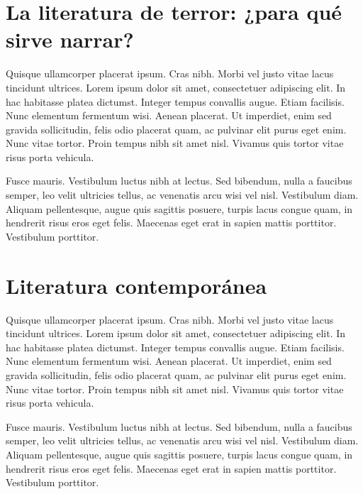 \section{La literatura de terror: ¿para qué sirve narrar?}

Quisque ullamcorper placerat ipsum. Cras nibh. Morbi vel justo vitae lacus tincidunt ultrices. Lorem ipsum dolor sit amet, consectetuer adipiscing elit. In hac habitasse platea dictumst. Integer tempus convallis augue. Etiam facilisis. Nunc elementum fermentum wisi. Aenean placerat. Ut imperdiet, enim sed gravida sollicitudin, felis odio placerat quam, ac pulvinar elit purus eget enim. Nunc vitae tortor. Proin tempus nibh sit amet nisl. Vivamus quis tortor vitae risus porta vehicula.

Fusce mauris. Vestibulum luctus nibh at lectus. Sed bibendum, nulla a faucibus semper, leo velit ultricies tellus, ac venenatis arcu wisi vel nisl. Vestibulum diam. Aliquam pellentesque, augue quis sagittis posuere, turpis lacus congue quam, in hendrerit risus eros eget felis. Maecenas eget erat in sapien mattis porttitor. Vestibulum porttitor.

\section{Literatura contemporánea}

Quisque ullamcorper placerat ipsum. Cras nibh. Morbi vel justo vitae lacus tincidunt ultrices. Lorem ipsum dolor sit amet, consectetuer adipiscing elit. In hac habitasse platea dictumst. Integer tempus convallis augue. Etiam facilisis. Nunc elementum fermentum wisi. Aenean placerat. Ut imperdiet, enim sed gravida sollicitudin, felis odio placerat quam, ac pulvinar elit purus eget enim. Nunc vitae tortor. Proin tempus nibh sit amet nisl. Vivamus quis tortor vitae risus porta vehicula.

Fusce mauris. Vestibulum luctus nibh at lectus. Sed bibendum, nulla a faucibus semper, leo velit ultricies tellus, ac venenatis arcu wisi vel nisl. Vestibulum diam. Aliquam pellentesque, augue quis sagittis posuere, turpis lacus congue quam, in hendrerit risus eros eget felis. Maecenas eget erat in sapien mattis porttitor. Vestibulum porttitor.

